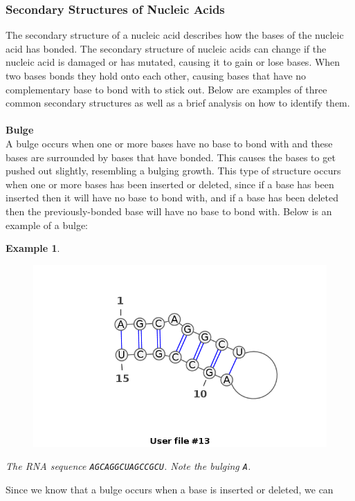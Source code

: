\documentclass{article}
\newtheorem{myex}{Example}
\begin{document}


\subsubsection{Secondary Structures of Nucleic Acids}\label{structs}
The secondary structure of a nucleic acid describes how the bases of the 
nucleic acid has bonded. The secondary structure of nucleic acids can change if 
the nucleic acid is damaged or has mutated, causing it to gain or lose 
bases. When two bases bonds they hold onto each other, causing bases that 
have no complementary base to bond with to stick out. Below are examples of three 
common secondary structures as well as a brief analysis on how to identify them.\\\\
\textbf{Bulge}\\ 
A bulge occurs when one or more bases have no base to bond with and these 
bases are surrounded by bases that have bonded. This causes the bases to get 
pushed out slightly, resembling a bulging growth. This type of structure occurs 
when one or more bases has been inserted or deleted, since if a base has been 
inserted then it will have no base to bond with, and if a base has been deleted 
then the previously-bonded base will have no base to bond with. 
Below is an example of a bulge:
\begin{myex}\centering
\begin{figure}[h]
\includegraphics[scale=0.4]{./lib/bulge.png}
\end{figure}
The RNA sequence {\tt AGCAGGCUAGCCGCU}. Note the bulging {\tt A}.
\end{myex}
Since we know that a bulge occurs when a base is inserted or deleted, we can 
\end{document}
